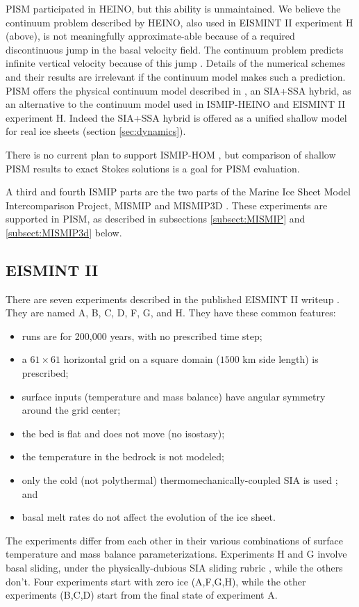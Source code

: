 PISM participated in HEINO, but this ability is unmaintained.   We believe the continuum problem described by HEINO, also used in EISMINT II experiment H (above), is not meaningfully approximate-able because of a required discontinuous jump in the basal velocity field.  The continuum problem predicts infinite vertical velocity because of this jump \cite[Appendix B]{BBssasliding}.  Details of the numerical schemes and their results are irrelevant if the continuum model makes such a prediction.  PISM offers the physical continuum model described in \cite{BBssasliding}, an SIA+SSA hybrid, as an alternative to the continuum model used in ISMIP-HEINO and EISMINT II experiment H.  Indeed the SIA+SSA hybrid is offered as a unified shallow model for real ice sheets (section \ref{sec:dynamics}).

There is no current plan to support ISMIP-HOM \cite{ISMIPHOM,HOMelmer}, but comparison of shallow PISM results to exact Stokes solutions is a goal for PISM evaluation.

A third and fourth ISMIP parts are the two parts of the Marine Ice Sheet Model Intercomparison Project, MISMIP \cite{MISMIP2012} and MISMIP3D \cite{MISMIP3d2013}.  These experiments are supported in PISM, as described in subsections \ref{subsect:MISMIP} and \ref{subsect:MISMIP3d} below.


\subsection{EISMINT II}\label{subsect:EISMINTII}

There are seven experiments described in the published EISMINT II writeup \cite{EISMINT00}.  They are named A, B, C, D, F, G, and H.  They have these common features:\begin{itemize}
\item runs are for 200,000 years, with no prescribed time step;
\item a $61\times 61$ horizontal grid on a square domain ($1500$ km side length) is prescribed;
\item surface inputs (temperature and mass balance) have angular symmetry around the grid center;
\item the bed is flat and does not move (no isostasy);
\item the temperature in the bedrock is not modeled;
\item only the cold (not polythermal) thermomechanically-coupled SIA is used \cite{EISMINT00}; and
\item basal melt rates do not affect the evolution of the ice sheet.
\end{itemize}
The experiments differ from each other in their various combinations of surface temperature and mass balance parameterizations.  Experiments H and G involve basal sliding, under the physically-dubious SIA sliding rubric \cite[Appendix B]{BBssasliding}, while the others don't.  Four experiments start with zero ice (A,F,G,H), while the other experiments (B,C,D) start from the final state of experiment A.


